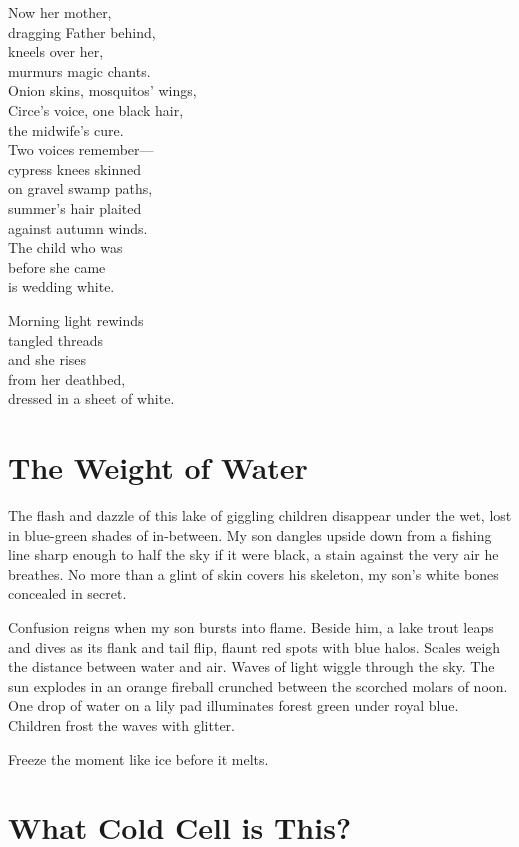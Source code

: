 \documentclass[twoside,10pt]{book}
\begin{document}
Now her mother,\\
dragging Father behind,\\
kneels over her,\\
murmurs magic chants.\\
Onion skins, mosquitos' wings,\\
Circe's voice, one black hair,\\
the midwife's cure.\\
Two voices remember---\\
cypress knees skinned\\
on gravel swamp paths,\\
summer's hair plaited\\
against autumn winds.\\
The child who was\\
before she came\\
is wedding white.

Morning light rewinds\\
tangled threads\\
and she rises\\
from her deathbed,\\
dressed in a sheet of white.


\clearpage
\section{The Weight of Water}

The flash and dazzle of this lake of giggling children disappear under
the wet, lost in blue-green shades of in-between. My son dangles upside
down from a fishing line sharp enough to half the sky if it were black,
a stain against the very air he breathes. No more than a glint of skin
covers his skeleton, my son's white bones concealed in secret.

Confusion reigns when my son bursts into flame. Beside him, a lake trout
leaps and dives as its flank and tail flip, flaunt red spots with blue
halos. Scales weigh the distance between water and air. Waves of light
wiggle through the sky. The sun explodes in an orange fireball crunched
between the scorched molars of noon. One drop of water on a lily pad
illuminates forest green under royal blue. Children frost the waves with
glitter.

Freeze the moment like ice before it melts.


\clearpage
\section{What Cold Cell is This?}
\end{document}
